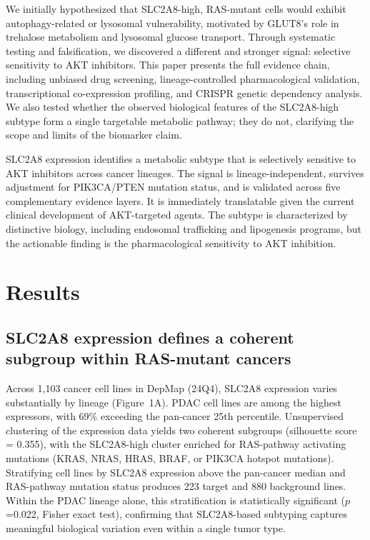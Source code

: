 \documentclass[12pt]{article}
\begin{document}
We initially hypothesized that SLC2A8-high, RAS-mutant cells would exhibit
autophagy-related or lysosomal vulnerability, motivated by GLUT8's role
in trehalose metabolism and lysosomal glucose transport. Through systematic
testing and falsification, we discovered a different and stronger signal:
selective sensitivity to AKT inhibitors. This paper presents the full
evidence chain, including unbiased drug screening, lineage-controlled
pharmacological validation, transcriptional co-expression profiling, and
CRISPR genetic dependency analysis. We also tested whether the observed
biological features of the SLC2A8-high subtype form a single targetable
metabolic pathway; they do not, clarifying the scope and limits of the
biomarker claim.

SLC2A8 expression identifies a metabolic subtype that is selectively
sensitive to AKT inhibitors across cancer lineages. The signal is
lineage-independent, survives adjustment for PIK3CA/PTEN mutation status,
and is validated across five complementary evidence layers. It is
immediately translatable given the current clinical development of
AKT-targeted agents. The subtype is characterized by distinctive biology,
including endosomal trafficking and lipogenesis programs, but the
actionable finding is the pharmacological sensitivity to AKT inhibition.

\section{Results}

\subsection{SLC2A8 expression defines a coherent subgroup within
RAS-mutant cancers}

Across 1,103 cancer cell lines in DepMap (24Q4), SLC2A8 expression
varies substantially by lineage (Figure~1A). PDAC cell lines are among
the highest expressors, with 69\% exceeding the pan-cancer 25th
percentile. Unsupervised clustering of the expression data yields two
coherent subgroups (silhouette score = 0.355), with the SLC2A8-high
cluster enriched for RAS-pathway activating mutations (KRAS, NRAS, HRAS,
BRAF, or PIK3CA hotspot mutations). Stratifying cell lines by SLC2A8
expression above the pan-cancer median and RAS-pathway mutation status
produces
223 target and 880 background lines. Within the PDAC lineage alone,
this stratification is statistically significant ($p$=0.022, Fisher
exact test), confirming that SLC2A8-based subtyping captures meaningful
biological variation even within a single tumor type.
\end{document}
